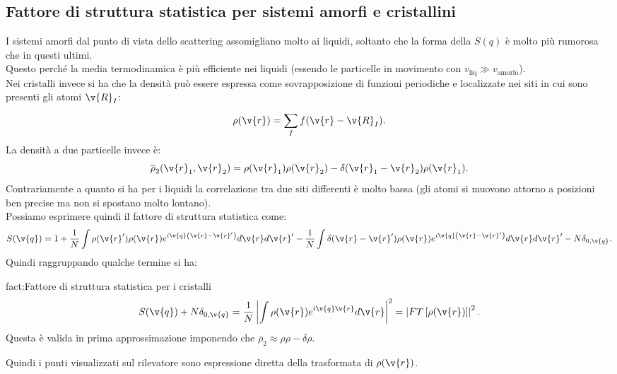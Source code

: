 \subsection{Fattore di struttura statistica per sistemi amorfi e cristallini}
\label{subsec:Fattore di struttura statistica per sistemi amorfi e cristallini}
I sistemi amorfi dal punto di vista dello scattering assomigliano molto ai liquidi, soltanto che la forma della $S(q)$ è molto più rumorosa che in questi ultimi.\\
Questo perché la media termodinamica è più efficiente nei liquidi (essendo le particelle in movimento con $v_\text{liq} \gg v_\text{amorfo} $).\\
Nei cristalli invece si ha che la densità può essere espressa come sovrapposizione di funzioni periodiche e localizzate nei siti in cui sono presenti gli atomi $\v{R}_I$:
\[
	\rho (\v{r}) 
	=
	\sum_{I}^{} f(\v{r}-\v{R}_I)
.\] 
La densità a due particelle invece è:
\[
	\overline{\rho} _2(\v{r}_1,\v{r}_2) 
	=
	\rho (\v{r}_1)\rho (\v{r}_2) - \delta(\v{r}_1-\v{r}_2)\rho (\v{r}_1)
.\] 
Contrariamente a quanto si ha per i liquidi la correlazione tra due siti differenti è molto bassa (gli atomi si muovono attorno a posizioni ben precise ma non si spostano molto lontano).\\
Possiamo esprimere quindi il fattore di struttura statistica come:
\[
	S(\v{q}) =
	1 + \frac{1}{N}\int \rho (\v{r}')\rho (\v{r}) e^{i \v{q}\left( \v{r}-\v{r}' \right) }d \v{r}d \v{r}'
	-
	\frac{1}{N}\int\delta(\v{r}-\v{r}')\rho (\v{r})e^{i \v{q}\left( \v{r}-\v{r}' \right)} d \v{r} d \v{r}' 
	- N \delta_{0,\v{q}}
.\] 
Quindi raggruppando qualche termine si ha:
\begin{fact}{fact:Fattore di struttura statistica per i cristalli}
	\[
		S(\v{q}) + N \delta_{0,\v{q}} 
		=
		\frac{1}{N}\left| \int\rho (\v{r})e^{i \v{q}\v{r}} d \v{r} \right|^2 = \left| FT\left[ \rho (\v{r}) \right]  \right| ^2
	.\] 
	Questa è valida in prima approssimazione imponendo che $\overline{\rho }_2\approx\rho\rho-\delta\rho$.
\end{fact}
Quindi i punti visualizzati sul rilevatore sono espressione diretta della trasformata di $\rho (\v{r})$. \\
